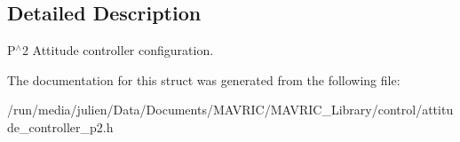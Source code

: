 \subsection{Detailed Description}
P$^\wedge$2 Attitude controller configuration. 

The documentation for this struct was generated from the following file\+:\begin{DoxyCompactItemize}
\item 
/run/media/julien/\+Data/\+Documents/\+M\+A\+V\+R\+I\+C/\+M\+A\+V\+R\+I\+C\+\_\+\+Library/control/attitude\+\_\+controller\+\_\+p2.\+h\end{DoxyCompactItemize}
